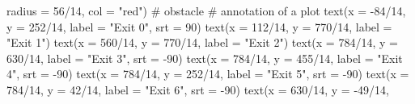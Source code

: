 \documentclass[
  letterpaper,
  DIV=11,
  numbers=noendperiod]{scrreprt}
\newenvironment{Shaded}{\begin{snugshade}}{\end{snugshade}}
\newcommand{\AttributeTok}[1]{\textcolor[rgb]{0.40,0.45,0.13}{#1}}
\newcommand{\CommentTok}[1]{\textcolor[rgb]{0.37,0.37,0.37}{#1}}
\newcommand{\DecValTok}[1]{\textcolor[rgb]{0.68,0.00,0.00}{#1}}
\newcommand{\FunctionTok}[1]{\textcolor[rgb]{0.28,0.35,0.67}{#1}}
\newcommand{\NormalTok}[1]{\textcolor[rgb]{0.00,0.23,0.31}{#1}}
\newcommand{\SpecialCharTok}[1]{\textcolor[rgb]{0.37,0.37,0.37}{#1}}
\newcommand{\StringTok}[1]{\textcolor[rgb]{0.13,0.47,0.30}{#1}}
\begin{document}
\begin{Shaded}
\begin{Highlighting}[]
                       \AttributeTok{radius =} \DecValTok{56}\SpecialCharTok{/}\DecValTok{14}\NormalTok{, }
                       \AttributeTok{col =} \StringTok{"red"}\NormalTok{) }\CommentTok{\# obstacle }
  \CommentTok{\# annotation of a plot}
  \FunctionTok{text}\NormalTok{(}\AttributeTok{x =} \SpecialCharTok{{-}}\DecValTok{84}\SpecialCharTok{/}\DecValTok{14}\NormalTok{,}
       \AttributeTok{y =} \DecValTok{252}\SpecialCharTok{/}\DecValTok{14}\NormalTok{,}
       \AttributeTok{label =} \StringTok{"Exit 0"}\NormalTok{,}
       \AttributeTok{srt =} \DecValTok{90}\NormalTok{)}
  \FunctionTok{text}\NormalTok{(}\AttributeTok{x =} \DecValTok{112}\SpecialCharTok{/}\DecValTok{14}\NormalTok{,}
       \AttributeTok{y =} \DecValTok{770}\SpecialCharTok{/}\DecValTok{14}\NormalTok{,}
       \AttributeTok{label =} \StringTok{"Exit 1"}\NormalTok{)}
  \FunctionTok{text}\NormalTok{(}\AttributeTok{x =} \DecValTok{560}\SpecialCharTok{/}\DecValTok{14}\NormalTok{,}
       \AttributeTok{y =} \DecValTok{770}\SpecialCharTok{/}\DecValTok{14}\NormalTok{,}
       \AttributeTok{label =} \StringTok{"Exit 2"}\NormalTok{)}
  \FunctionTok{text}\NormalTok{(}\AttributeTok{x =} \DecValTok{784}\SpecialCharTok{/}\DecValTok{14}\NormalTok{,}
       \AttributeTok{y =} \DecValTok{630}\SpecialCharTok{/}\DecValTok{14}\NormalTok{,}
       \AttributeTok{label =} \StringTok{"Exit 3"}\NormalTok{,}
       \AttributeTok{srt =} \SpecialCharTok{{-}}\DecValTok{90}\NormalTok{)}
  \FunctionTok{text}\NormalTok{(}\AttributeTok{x =} \DecValTok{784}\SpecialCharTok{/}\DecValTok{14}\NormalTok{,}
       \AttributeTok{y =} \DecValTok{455}\SpecialCharTok{/}\DecValTok{14}\NormalTok{,}
       \AttributeTok{label =} \StringTok{"Exit 4"}\NormalTok{,}
       \AttributeTok{srt =} \SpecialCharTok{{-}}\DecValTok{90}\NormalTok{)}
  \FunctionTok{text}\NormalTok{(}\AttributeTok{x =} \DecValTok{784}\SpecialCharTok{/}\DecValTok{14}\NormalTok{,}
       \AttributeTok{y =} \DecValTok{252}\SpecialCharTok{/}\DecValTok{14}\NormalTok{,}
       \AttributeTok{label =} \StringTok{"Exit 5"}\NormalTok{,}
       \AttributeTok{srt =} \SpecialCharTok{{-}}\DecValTok{90}\NormalTok{)}
  \FunctionTok{text}\NormalTok{(}\AttributeTok{x =} \DecValTok{784}\SpecialCharTok{/}\DecValTok{14}\NormalTok{, }
       \AttributeTok{y =} \DecValTok{42}\SpecialCharTok{/}\DecValTok{14}\NormalTok{,}
       \AttributeTok{label =} \StringTok{"Exit 6"}\NormalTok{,}
       \AttributeTok{srt =} \SpecialCharTok{{-}}\DecValTok{90}\NormalTok{)}
  \FunctionTok{text}\NormalTok{(}\AttributeTok{x =} \DecValTok{630}\SpecialCharTok{/}\DecValTok{14}\NormalTok{,}
       \AttributeTok{y =} \SpecialCharTok{{-}}\DecValTok{49}\SpecialCharTok{/}\DecValTok{14}\NormalTok{,}

\end{Highlighting}
\end{Shaded}
\end{document}
